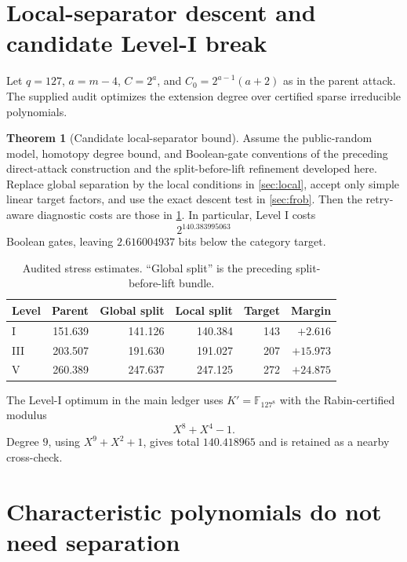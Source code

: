 \documentclass[11pt,a4paper]{article}
\theoremstyle{definition}
\newtheorem{theorem}{Theorem}[section]
\theoremstyle{remark}
\newcommand{\F}{\mathbb F}
\begin{document}
\section{Local-separator descent and candidate Level-I break}\label{sec:local-separator-upgrade}

Let $q=127$, $a=m-4$, $C=2^a$, and $C_0=2^{a-1}(a+2)$ as in the parent attack.  The supplied audit optimizes the extension degree over certified sparse irreducible polynomials.

\begin{theorem}[Candidate local-separator bound]\label{thm:headline}
Assume the public-random model, homotopy degree bound, and Boolean-gate conventions of the preceding direct-attack construction and the split-before-lift refinement developed here.  Replace global separation by the local conditions in \cref{sec:local}, accept only simple linear target factors, and use the exact descent test in \cref{sec:frob}.  Then the retry-aware diagnostic costs are those in \cref{tab:headline}.  In particular, Level I costs
\[
 2^{140.383995063}
\]
Boolean gates, leaving $2.616004937$ bits below the category target.
\end{theorem}

\begin{table}[h]
\centering
\caption{Audited stress estimates.  ``Global split'' is the preceding split-before-lift bundle.}
\label{tab:headline}
\begin{tabular}{@{}lrrrrr@{}}
\toprule
Level & Parent & Global split & Local split & Target & Margin\\
\midrule
I   & 151.639 & 141.126 & 140.384 & 143 & $+2.616$\\
III & 203.507 & 191.630 & 191.027 & 207 & $+15.973$\\
V   & 260.389 & 247.637 & 247.125 & 272 & $+24.875$\\
\bottomrule
\end{tabular}
\end{table}

The Level-I optimum in the main ledger uses $K'=\F_{127^8}$ with the Rabin-certified modulus
\[
 X^8+X^4-1.
\]
Degree $9$, using $X^9+X^2+1$, gives total $140.418965$ and is retained as a nearby cross-check.

\section{Characteristic polynomials do not need separation}\label{sec:charpoly}
\end{document}
